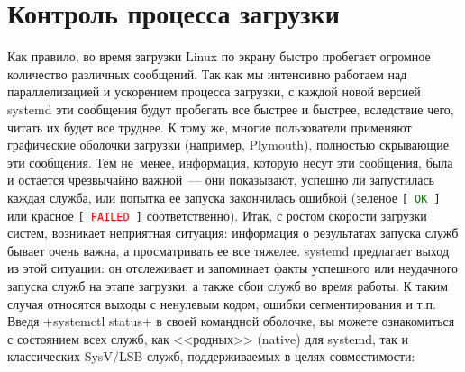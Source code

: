 \documentclass[10pt,oneside,a4paper]{article}
\begin{document}
\section{Контроль процесса загрузки}
Как правило, во время загрузки Linux по экрану быстро пробегает огромное
количество различных сообщений. Так как мы интенсивно работаем над
параллелизацией и ускорением процесса загрузки, с каждой новой версией
systemd эти сообщения будут пробегать все быстрее и быстрее, вследствие чего,
читать их будет все труднее. К тому же, многие пользователи применяют
графические оболочки загрузки (например, Plymouth), полностью скрывающие эти
сообщения. Тем не~менее, информация, которую несут эти сообщения, была и
остается чрезвычайно важной~--- они показывают, успешно ли запустилась каждая
служба, или попытка ее запуска закончилась ошибкой (зеленое
\texttt{[~\textcolor{green}{OK}~]} или красное
\texttt{[~\textcolor{red}{FAILED}~]} соответственно). Итак, с ростом скорости
загрузки систем, возникает неприятная ситуация: информация о результатах
запуска служб бывает очень важна, а просматривать ее все тяжелее. systemd
предлагает выход из этой ситуации: он отслеживает и запоминает факты успешного
или неудачного запуска служб на этапе загрузки, а также сбои служб во время
работы. К таким случая относятся выходы с ненулевым кодом, ошибки
сегментирования и т.п. Введя +systemctl status+ в своей командной оболочке, вы
можете ознакомиться с состоянием всех служб, как <<родных>> (native) для
systemd, так и классических SysV/LSB служб, поддерживаемых в целях
совместимости: 
\end{document}
